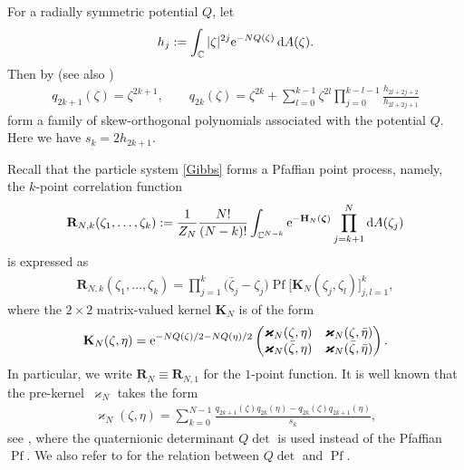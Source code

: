 \documentclass[pdftex]{sigma}
\numberwithin{equation}{section}
\newcommand{\bfR}{\mathbf{R}}
\newcommand{\bfH}{{\mathbf H}}
\newcommand{\bfK}{{\mathbf K}}
\newcommand{\bfkappa}{{\bm \varkappa}}
\newcommand{\C}{{\mathbb C}}
\newcommand{\1}{\chi}
\newcommand{\Pf}{{\operatorname{Pf}}}
\begin{document}
For a radially symmetric potential $Q$, let
\begin{gather*}
	h_j:=\int_\C |\zeta|^{2j} {\rm e}^{-N Q(\zeta)} \, {\rm d}A(\zeta).
\end{gather*}
Then by \cite[Theorem 3.1]{akemann2021skew} (see also \cite[p.~7]{MR3066113})
\begin{gather} \label{skew op_rad}
	q_{2k+1}(\zeta)=\zeta^{2k+1}, \qquad q_{2k}(\zeta)=\zeta^{2k}+\sum_{l=0}^{k-1} \zeta^{2l} \prod_{j=0}^{k-l-1} \frac{h_{2l+2j+2} }{ h_{2l+2j+1} }
\end{gather}
form a family of skew-orthogonal polynomials associated with the potential $Q$. Here we have $s_k=2h_{2k+1}.$

Recall that the particle system \eqref{Gibbs} forms a Pfaffian point process, namely, the $k$-point correlation function
\begin{gather} \label{bfRNk def}
	\bfR_{N,k}(\zeta_1,\dots,\zeta_k):=\frac{1}{Z_N} \frac{N!}{(N-k)!} \int_{ \C^{N-k} } {\rm e}^{- \bfH_N( \boldsymbol{\zeta} ) } \prod_{j=k+1}^N {\rm d}A(\zeta_j)
\end{gather}
is expressed as
\begin{gather} \label{bfRNk Pf}
	\bfR_{N,k}(\zeta_1,\dots, \zeta_k)= \prod_{j=1}^{k} \big(\bar{\zeta}_j-\zeta_j\big) \Pf \big[ \bfK_{N}(\zeta_j,\zeta_l) \big]_{ j,l=1 }^k,
\end{gather}
where the $2 \times 2$ matrix-valued kernel $\bfK_N$ is of the form
\begin{gather} \label{bfK Pf}
	\bfK_N(\zeta,\eta)={\rm e}^{ -NQ(\zeta)/2-NQ(\eta)/2 }
	\begin{pmatrix}
		\bfkappa_N(\zeta,\eta) & \bfkappa_N(\zeta,\bar{\eta}) \\
		\bfkappa_N(\bar{\zeta},\eta) & \bfkappa_N(\bar{\zeta},\bar{\eta})
	\end{pmatrix}.
\end{gather}
In particular, we write $\bfR_{N} \equiv \bfR_{N,1}$ for the $1$-point function.
It is well known that the pre-kernel~$\bfkappa_N$ takes the form
\begin{gather} \label{bfkappaN}
	\bfkappa_N(\zeta,\eta)=\sum_{k=0}^{N-1} \frac{q_{2k+1}(\zeta) q_{2k}(\eta) -q_{2k}(\zeta) q_{2k+1}(\eta)}{s_k},
\end{gather}
see \cite{MR1928853}, where the quaternionic determinant $Q\det$ is used instead of the Pfaffian $\Pf$. We also refer to \cite{Mehta} for the relation between $Q\det$ and $\Pf$.
\end{document}
